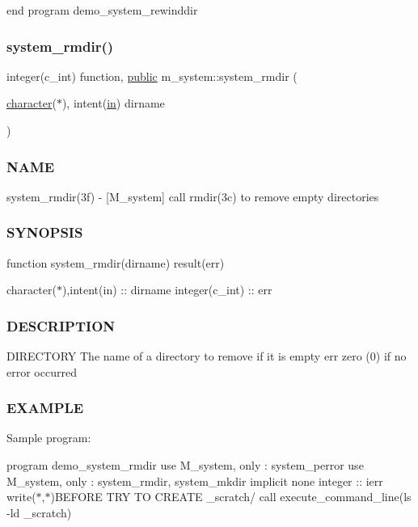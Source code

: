 end program demo\+\_\+system\+\_\+rewinddir \mbox{\label{namespacem__system_a21fd3e1ccd50cef6adc539ef3d7a9836}} 
\subsubsection{\texorpdfstring{system\+\_\+rmdir()}{system\_rmdir()}}
{\footnotesize\ttfamily integer(c\+\_\+int) function, \hyperlink{M__stopwatch_83_8txt_a2f74811300c361e53b430611a7d1769f}{public} m\+\_\+system\+::system\+\_\+rmdir (\begin{DoxyParamCaption}\item[{\hyperlink{option__stopwatch_83_8txt_abd4b21fbbd175834027b5224bfe97e66}{character}($\ast$), intent(\hyperlink{M__journal_83_8txt_afce72651d1eed785a2132bee863b2f38}{in})}]{dirname }\end{DoxyParamCaption})}



\subsubsection*{N\+A\+ME}

system\+\_\+rmdir(3f) -\/ \mbox{[}M\+\_\+system\mbox{]} call rmdir(3c) to remove empty directories \subsubsection*{S\+Y\+N\+O\+P\+S\+IS}

function system\+\_\+rmdir(dirname) result(err)

character($\ast$),intent(in) \+:\+: dirname integer(c\+\_\+int) \+:\+: err \subsubsection*{D\+E\+S\+C\+R\+I\+P\+T\+I\+ON}

D\+I\+R\+E\+C\+T\+O\+RY The name of a directory to remove if it is empty err zero (0) if no error occurred \subsubsection*{E\+X\+A\+M\+P\+LE}

Sample program\+:

program demo\+\_\+system\+\_\+rmdir use M\+\_\+system, only \+: system\+\_\+perror use M\+\_\+system, only \+: system\+\_\+rmdir, system\+\_\+mkdir implicit none integer \+:\+: ierr write($\ast$,$\ast$)\textquotesingle{}B\+E\+F\+O\+RE T\+RY TO C\+R\+E\+A\+TE \+\_\+scratch/\textquotesingle{} call execute\+\_\+command\+\_\+line(\textquotesingle{}ls -\/ld \+\_\+scratch\textquotesingle{})

